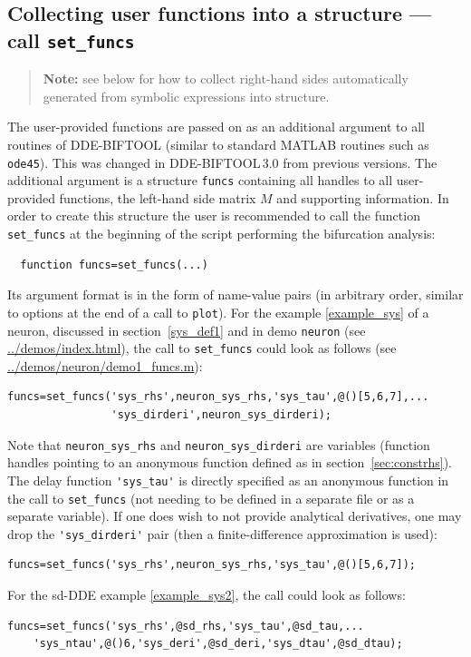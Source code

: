 \documentclass[10pt]{scrartcl}
\newcommand{\DDEBIFCODE}{\textsc{DDE-BIFTOOL}}
\newcommand{\demobase}{\url{../demos/index.html}}
\newcommand{\blist}[1]{\mbox{\lstinline!#1!}}
\begin{document}
\subsection{Collecting user functions into a structure --- call
  \texorpdfstring{\blist{set_funcs}}{set\_funcs}}
\label{sec:funcs}
\begin{quote}
  \textbf{Note:} see below for how to collect right-hand sides
  automatically generated from symbolic expressions into structure.
\end{quote}
The user-provided functions are passed on as an additional argument to
all routines of \DDEBIFCODE{} (similar to standard MATLAB routines
such as \blist{ode45}). This was changed in \DDEBIFCODE{}\,3.0 from
previous versions. The additional argument is a structure
\blist{funcs} containing all handles to all user-provided functions,
the left-hand side matrix $M$ and supporting information. In order to
create this structure the user is recommended to call the function
\blist{set_funcs} at the beginning of the script performing the
bifurcation analysis:
\begin{lstlisting}
  function funcs=set_funcs(...)
\end{lstlisting}
Its argument format is in the form of name-value pairs (in arbitrary
order, similar to options at the end of a call to \blist{plot}). For
the example \eqref{example_sys} of a neuron, discussed in
section~\ref{sys_def1} and in demo \texttt{neuron} (see
\demobase{}), the call to \blist{set_funcs} could look as
follows (see \url{../demos/neuron/demo1_funcs.m}):
\begin{lstlisting}
funcs=set_funcs('sys_rhs',neuron_sys_rhs,'sys_tau',@()[5,6,7],...
                'sys_dirderi',neuron_sys_dirderi);
\end{lstlisting}
Note that \blist{neuron_sys_rhs} and \blist{neuron_sys_dirderi} are variables (function handles
pointing to an anonymous function defined as in
section~\ref{sec:constrhs}). The delay function
\blist{'sys_tau'} is directly specified as an anonymous function in
the call to \blist{set_funcs} (not needing to be defined in a separate
file or as a separate variable). If one does wish to not provide
analytical derivatives, one may drop the \blist{'sys_dirderi'} pair (then
a finite-difference approximation is
used):
\begin{lstlisting}
funcs=set_funcs('sys_rhs',neuron_sys_rhs,'sys_tau',@()[5,6,7]);
\end{lstlisting}
For the sd-DDE example \eqref{example_sys2}, the call could look as follows:
\begin{lstlisting}
funcs=set_funcs('sys_rhs',@sd_rhs,'sys_tau',@sd_tau,...
    'sys_ntau',@()6,'sys_deri',@sd_deri,'sys_dtau',@sd_dtau);  
\end{lstlisting}
\end{document}
